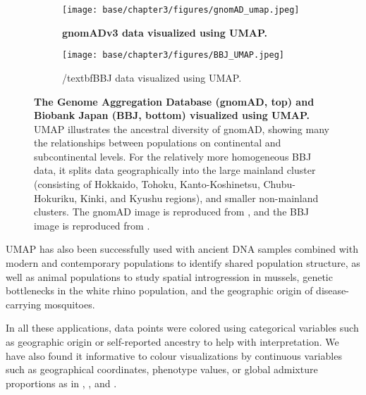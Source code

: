 \begin{figure}[h!]
  \centering
  \begin{subfigure}[b]{0.5\linewidth}
    \texttt{[image: base/chapter3/figures/gnomAD\_umap.jpeg]}
    \caption{\textbf{gnomADv3 data visualized using UMAP.}}
    \label{fig:gnomAD_UMAP}
  \end{subfigure}

  \begin{subfigure}[b]{0.5\linewidth}
    \texttt{[image: base/chapter3/figures/BBJ\_UMAP.jpeg]}
    \caption{/textbf{BBJ data visualized using UMAP.}}
    \label{fig:BBJ_UMAP}
  \end{subfigure}
  \caption[UMAP of gnomAD and Biobank Japan]{\textbf{The Genome Aggregation Database (gnomAD, top) and Biobank Japan (BBJ, bottom) visualized using UMAP.} UMAP illustrates the ancestral diversity of gnomAD, showing many the relationships between populations on continental and subcontinental levels. For the relatively more homogeneous BBJ data, it splits data geographically into the large mainland cluster (consisting of Hokkaido, Tohoku, Kanto-Koshinetsu, Chubu-Hokuriku, Kinki, and Kyushu regions), and smaller non-mainland clusters. The gnomAD image is reproduced from \citep{karczewski_mutational_2020}, and the BBJ image is reproduced from \citep{sakaue_dimensionality_2020}.
  }
  \label{fig:external_UMAP}
\end{figure}

\clearpage

UMAP has also been successfully used with ancient DNA samples combined with modern and contemporary populations to identify shared population structure\citep{margaryan_population_2019}, as well as animal populations to study spatial introgression in mussels\citep{simon_local_2019}, genetic bottlenecks in the white rhino population\citep{sanchez-barreiro_historical_2020}, and the geographic origin of disease-carrying mosquitoes\citep{consortium_genome_2020,schmidt2020population}. 

In all these applications, data points were colored using categorical variables such as geographic origin or self-reported ancestry to help with interpretation. We have also found it informative to colour visualizations by continuous variables such as geographical coordinates, phenotype values, or global admixture proportions as in \citep{diaz-papkovich_umap_2019}, \citep{dai_population_2020}, and \citep{spear2020recent}.


